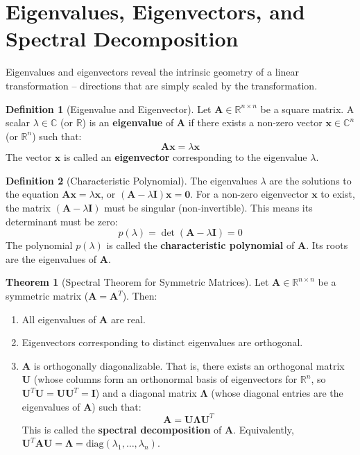 \documentclass[12pt, letterpaper]{article}
\theoremstyle{definition}
\newtheorem{definition}{Definition}[section]
\newtheorem{theorem}{Theorem}[section]
\newcommand{\R}{\mathbb{R}}
\newcommand{\mat}[1]{\mathbf{#1}} %
\newcommand{\vect}[1]{\mathbf{#1}} %
\newcommand{\x}{\vect{x}} %
\newcommand{\diag}{\text{diag}}
\begin{document}
\section{Eigenvalues, Eigenvectors, and Spectral Decomposition}

Eigenvalues and eigenvectors reveal the intrinsic geometry of a linear transformation – directions that are simply scaled by the transformation.

\begin{definition}[Eigenvalue and Eigenvector]
Let $\mat{A} \in \R^{n \times n}$ be a square matrix. A scalar $\lambda \in \mathbb{C}$ (or $\R$) is an \textbf{eigenvalue} of $\mat{A}$ if there exists a non-zero vector $\x \in \mathbb{C}^n$ (or $\R^n$) such that:
\[ \mat{A}\x = \lambda \x \]
The vector $\x$ is called an \textbf{eigenvector} corresponding to the eigenvalue $\lambda$.
\end{definition}

\begin{definition}[Characteristic Polynomial]
The eigenvalues $\lambda$ are the solutions to the equation $\mat{A}\x = \lambda \x$, or $(\mat{A} - \lambda \mat{I})\x = \vect{0}$. For a non-zero eigenvector $\x$ to exist, the matrix $(\mat{A} - \lambda \mat{I})$ must be singular (non-invertible). This means its determinant must be zero:
\[ p(\lambda) = \det(\mat{A} - \lambda \mat{I}) = 0 \]
The polynomial $p(\lambda)$ is called the \textbf{characteristic polynomial} of $\mat{A}$. Its roots are the eigenvalues of $\mat{A}$.
\end{definition}

\begin{theorem}[Spectral Theorem for Symmetric Matrices]
Let $\mat{A} \in \R^{n \times n}$ be a symmetric matrix ($\mat{A} = \mat{A}^T$). Then:
\begin{enumerate}
    \item All eigenvalues of $\mat{A}$ are real.
    \item Eigenvectors corresponding to distinct eigenvalues are orthogonal.
    \item $\mat{A}$ is orthogonally diagonalizable. That is, there exists an orthogonal matrix $\mat{U}$ (whose columns form an orthonormal basis of eigenvectors for $\R^n$, so $\mat{U}^T \mat{U} = \mat{U} \mat{U}^T = \mat{I}$) and a diagonal matrix $\mat{\Lambda}$ (whose diagonal entries are the eigenvalues of $\mat{A}$) such that:
    \[ \mat{A} = \mat{U} \mat{\Lambda} \mat{U}^T \]
    This is called the \textbf{spectral decomposition} of $\mat{A}$. Equivalently, $\mat{U}^T \mat{A} \mat{U} = \mat{\Lambda} = \allowbreak \diag(\lambda_1, \dots, \lambda_n)$. %
\end{enumerate}
\end{theorem}
\end{document}
